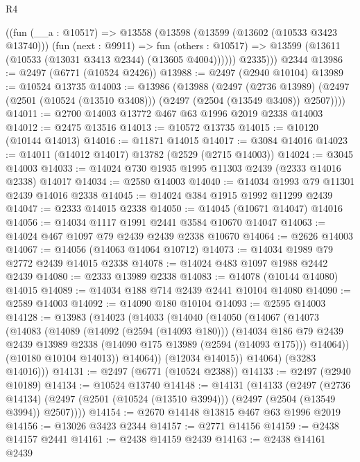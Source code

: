 \begin{lexlean}{R4}
\begin{coremodule}
        ((fun (__a : @10517) =>
        @13558
          (@13598
            (@13599 (@13602 (@10533 @3423 @13740)))
            (fun (next : @9911) =>
            fun (others : @10517) => @13599 (@13611 (@10533 (@13031 @3413 @2344) (@13605 @4004))))))
          @2335)))
    @2344
@13986 := @2497 (@6771 (@10524 @2426))
@13988 := @2497 (@2940 @10104)
@13989 := @10524 @13735
@14003 := @13986
    (@13988
      (@2497
        (@2736 @13989)
        (@2497 (@2501 (@10524 (@13510 @3408))) (@2497 (@2504 (@13549 @3408)) @2507))))
@14011 := @2700 @14003 @13772 @467 @63 @1996 @2019 @2338 @14003
@14012 := @2475 @13516
@14013 := @10572 @13735
@14015 := @10120 (@10144 @14013)
@14016 := @11871 @14015
@14017 := @3084 @14016
@14023 := @14011 (@14012 @14017) @13782 (@2529 (@2715 @14003))
@14024 := @3045 @14003
@14033 := @14024 @730 @1935 @1995 @11303 @2439 (@2333 @14016 @2338) @14017
@14034 := @2580 @14003
@14040 := @14034 @1993 @79 @11301 @2439 @14016 @2338
@14045 := @14024 @384 @1915 @1992 @11299 @2439
@14047 := @2333 @14015 @2338
@14050 := @14045 (@10671 @14047) @14016
@14056 := @14034 @1117 @1991 @2441 @3584 @10670 @14047
@14063 := @14024 @467 @1097 @79 @2439 @2439 @2338 @10670
@14064 := @2626 @14003
@14067 := @14056 (@14063 @14064 @10712)
@14073 := @14034 @1989 @79 @2772 @2439 @14015 @2338
@14078 := @14024 @483 @1097 @1988 @2442 @2439
@14080 := @2333 @13989 @2338
@14083 := @14078 (@10144 @14080) @14015
@14089 := @14034 @188 @714 @2439 @2441 @10104 @14080
@14090 := @2589 @14003
@14092 := @14090 @180 @10104
@14093 := @2595 @14003
@14128 := @13983
    (@14023
      (@14033
        (@14040
          (@14050
            (@14067
              (@14073
                (@14083
                  (@14089
                    (@14092 (@2594 (@14093 @180)))
                    (@14034
                      @186
                      @79
                      @2439
                      @2439
                      @13989
                      @2338
                      (@14090 @175 @13989 (@2594 (@14093 @175)))
                      @14064))
                  (@10180 @10104 @14013))
                @14064))
            (@12034 @14015))
          @14064)
        (@3283 @14016)))
@14131 := @2497 (@6771 (@10524 @2388))
@14133 := @2497 (@2940 @10189)
@14134 := @10524 @13740
@14148 := @14131
    (@14133
      (@2497
        (@2736 @14134)
        (@2497 (@2501 (@10524 (@13510 @3994))) (@2497 (@2504 (@13549 @3994)) @2507))))
@14154 := @2670 @14148 @13815 @467 @63 @1996 @2019
@14156 := @13026 @3423 @2344
@14157 := @2771 @14156
@14159 := @2438 @14157 @2441
@14161 := @2438 @14159 @2439
@14163 := @2438 @14161 @2439

\end{coremodule}
\end{lexlean}
